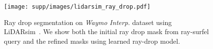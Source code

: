 \begin{figure}[t]
\centering
\texttt{[image: supp/images/lidarsim\_ray\_drop.pdf]}

\caption{Ray drop segmentation on \textit{Waymo Interp.} dataset using LiDARsim~\cite{manivasagam2020lidarsim}. We show both the initial ray drop mask from ray-surfel query and the refined masks using learned ray-drop model.}
\label{fig:iccv_supp_lidarsim_raydrop}

\end{figure}
